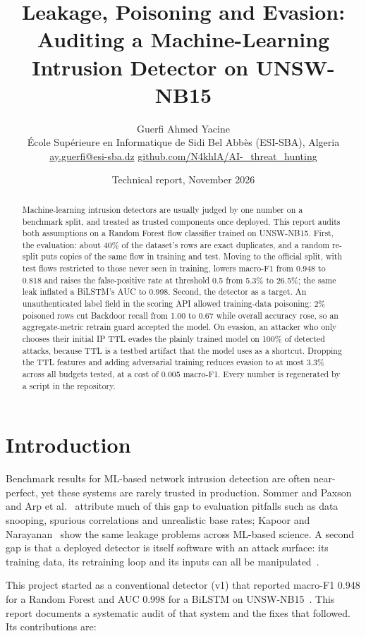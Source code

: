 \documentclass[11pt,a4paper]{article}
\title{\textbf{Leakage, Poisoning and Evasion:\\Auditing a Machine-Learning Intrusion Detector on UNSW-NB15}}
\author{Guerfi Ahmed Yacine\\
\small École Supérieure en Informatique de Sidi Bel Abbès (ESI-SBA), Algeria\\
\small \href{mailto:ay.guerfi@esi-sba.dz}{ay.guerfi@esi-sba.dz} \quad
\href{https://github.com/N4khlA/AI-_threat_hunting}{github.com/N4khlA/AI-\_threat\_hunting}}
\date{Technical report, November 2026}
\begin{document}
\maketitle

\begin{abstract}
\noindent
Machine-learning intrusion detectors are usually judged by one number on a
benchmark split, and treated as trusted components once deployed. This
report audits both assumptions on a Random Forest flow classifier trained on
UNSW-NB15. First, the evaluation: about 40\% of the dataset's rows are exact
duplicates, and a random re-split puts copies of the same flow in training
and test. Moving to the official split, with test flows restricted to those
never seen in training, lowers macro-F1 from 0.948 to 0.818 and raises the
false-positive rate at threshold 0.5 from 5.3\% to 26.5\%; the same leak
inflated a BiLSTM's AUC to 0.998. Second, the detector as a target. An
unauthenticated label field in the scoring API allowed training-data
poisoning: 2\% poisoned rows cut Backdoor recall from 1.00 to 0.67 while
overall accuracy rose, so an aggregate-metric retrain guard accepted the
model. On evasion, an attacker who only chooses their initial IP TTL evades
the plainly trained model on 100\% of detected attacks, because TTL is a
testbed artifact that the model uses as a shortcut. Dropping the TTL
features and adding adversarial training reduces evasion to at most 3.3\%
across all budgets tested, at a cost of 0.005 macro-F1. Every number is
regenerated by a script in the repository.
\end{abstract}

\section{Introduction}

Benchmark results for ML-based network intrusion detection are often
near-perfect, yet these systems are rarely trusted in production. Sommer and
Paxson~\cite{sommer2010} and Arp et al.~\cite{arp2022} attribute much of this
gap to evaluation pitfalls such as data snooping, spurious correlations and
unrealistic base rates; Kapoor and Narayanan~\cite{kapoor2023} show the same
leakage problems across ML-based science. A second gap is that a deployed
detector is itself software with an attack surface: its training data, its
retraining loop and its inputs can all be manipulated~\cite{biggio2018}.

This project started as a conventional detector (v1) that reported
macro-F1 0.948 for a Random Forest and AUC 0.998 for a BiLSTM on
UNSW-NB15~\cite{moustafa2015}. This report documents a systematic audit of
that system and the fixes that followed. Its contributions are:
\end{document}
